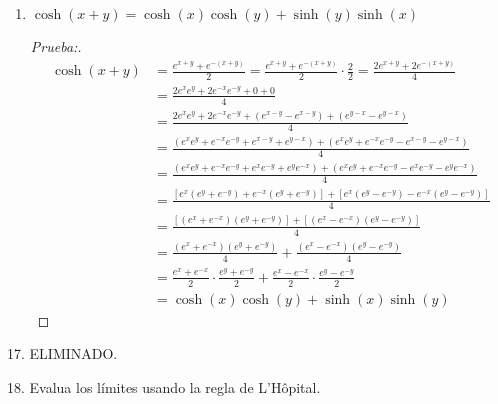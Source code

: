 \documentclass[12pt]{article}
\begin{document}
\begin{enumerate}[\hspace{9px} a)]
    \item \(\cosh(x+y)=\cosh(x)\cosh(y)+\sinh(y)\sinh(x)\)
    
    \begin{proof}[Prueba:]
        \begin{align*}
            \cosh(x+y) &= \frac{e^{x+y}+e^{-(x+y)}}{2} = \frac{e^{x+y}+e^{-(x+y)}}{2}\cdot\frac{2}{2} = \frac{2e^{x+y}+2e^{-(x+y)}}{4}\\
            &= \frac{2e^xe^y+2e^{-x}e^{-y}+0+0}{4}\\
            &= \frac{2e^xe^y+2e^{-x}e^{-y}+(e^{x-y}-e^{x-y})+(e^{y-x}-e^{y-x})}{4}\\
            &= \frac{(e^xe^y+e^{-x}e^{-y}+e^{x-y}+e^{y-x})+(e^xe^y+e^{-x}e^{-y}-e^{x-y}-e^{y-x})}{4}\\
            &= \frac{(e^xe^y+e^{-x}e^{-y}+e^xe^{-y}+e^ye^{-x})+(e^xe^y+e^{-x}e^{-y}-e^xe^{-y}-e^ye^{-x})}{4}\\
            &= \frac{[e^x(e^y+e^{-y})+e^{-x}(e^y+e^{-y})]+[e^x(e^y-e^{-y})-e^{-x}(e^y-e^{-y})]}{4}\\
            &= \frac{[(e^x+e^{-x})(e^y+e^{-y})]+[(e^x-e^{-x})(e^y-e^{-y})]}{4}\\
            &= \frac{(e^x+e^{-x})(e^y+e^{-y})}{4}+\frac{(e^x-e^{-x})(e^y-e^{-y})}{4}\\
            &= \frac{e^x+e^{-x}}{2}\cdot\frac{e^y+e^{-y}}{2}+\frac{e^x-e^{-x}}{2}\cdot\frac{e^y-e^{-y}}{2}\\
            &= \cosh(x)\cosh(y)+\sinh(x)\sinh(y)
        \end{align*}
    \end{proof}

\end{enumerate}

17. ELIMINADO.\medskip

18. Evalua los l\'imites usando la regla de L'H\^opital.
\end{document}
